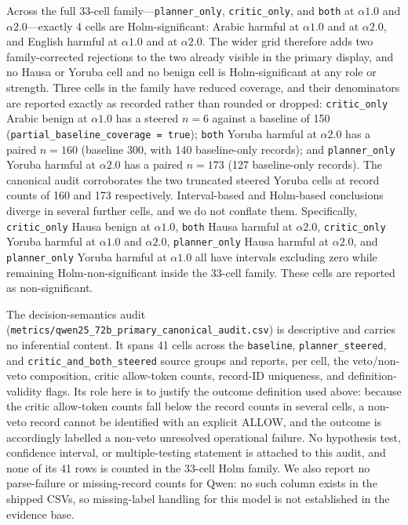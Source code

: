 Across the full 33-cell family---\texttt{planner\_only}, \texttt{critic\_only},
and \texttt{both} at $\alpha1.0$ and $\alpha2.0$---exactly 4 cells are
Holm-significant: Arabic harmful at $\alpha1.0$ and at $\alpha2.0$, and English
harmful at $\alpha1.0$ and at $\alpha2.0$. The wider grid therefore adds two
family-corrected rejections to the two already visible in the primary display,
and no Hausa or Yoruba cell and no benign cell is Holm-significant at any role
or strength. Three cells in the family have reduced coverage, and their
denominators are reported exactly as recorded rather than rounded or dropped:
\texttt{critic\_only} Arabic benign at $\alpha1.0$ has a steered $n = 6$ against
a baseline of 150 (\texttt{partial\_baseline\_coverage = true});
\texttt{both} Yoruba harmful at $\alpha2.0$ has a paired $n = 160$ (baseline
300, with 140 baseline-only records); and \texttt{planner\_only} Yoruba harmful
at $\alpha2.0$ has a paired $n = 173$ (127 baseline-only records). The canonical
audit corroborates the two truncated steered Yoruba cells at record counts of
160 and 173 respectively. Interval-based and Holm-based conclusions diverge in
several further cells, and we do not conflate them. Specifically,
\texttt{critic\_only} Hausa benign at $\alpha1.0$, \texttt{both} Hausa harmful
at $\alpha2.0$, \texttt{critic\_only} Yoruba harmful at $\alpha1.0$ and
$\alpha2.0$, \texttt{planner\_only} Hausa harmful at $\alpha2.0$, and
\texttt{planner\_only} Yoruba harmful at $\alpha1.0$ all have intervals
excluding zero while remaining Holm-non-significant inside the 33-cell family.
These cells are reported as non-significant.

The decision-semantics audit
(\texttt{metrics/qwen25\_72b\_primary\_canonical\_audit.csv}) is descriptive and
carries no inferential content. It spans 41 cells across the \texttt{baseline},
\texttt{planner\_steered}, and \texttt{critic\_and\_both\_steered} source groups
and reports, per cell, the veto/non-veto composition, critic allow-token counts,
record-ID uniqueness, and definition-validity flags. Its role here is to justify
the outcome definition used above: because the critic allow-token counts fall
below the record counts in several cells, a non-veto record cannot be identified
with an explicit ALLOW, and the outcome is accordingly labelled a non-veto
unresolved operational failure. No hypothesis test, confidence interval, or
multiple-testing statement is attached to this audit, and none of its 41 rows is
counted in the 33-cell Holm family. We also report no parse-failure or
missing-record counts for Qwen: no such column exists in the shipped CSVs, so
missing-label handling for this model is not established in the evidence base.

